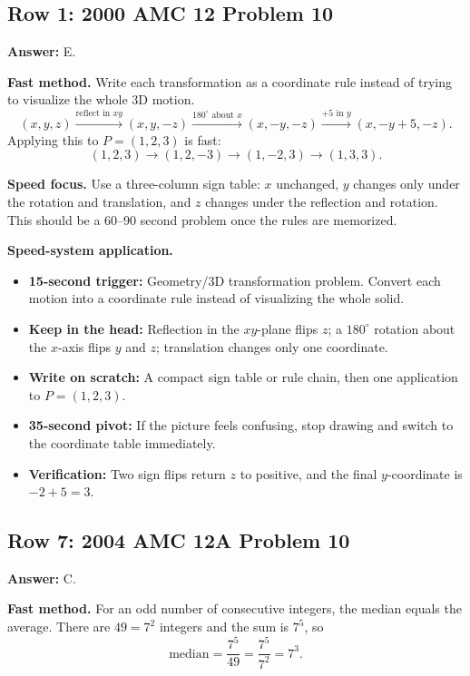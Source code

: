 \documentclass[11pt]{article}
\begin{document}
\subsection{Row 1: 2000 AMC 12 Problem 10}

\textbf{Answer:} E.

\textbf{Fast method.} Write each transformation as a coordinate rule instead of trying to visualize the whole 3D motion.
\[
(x,y,z)\xrightarrow{\text{reflect in }xy}(x,y,-z)
\xrightarrow{180^\circ\text{ about }x}(x,-y,-z)
\xrightarrow{+5\text{ in }y}(x,-y+5,-z).
\]
Applying this to \(P=(1,2,3)\) is fast:
\[
(1,2,3)\to(1,2,-3)\to(1,-2,3)\to(1,3,3).
\]

\textbf{Speed focus.} Use a three-column sign table: \(x\) unchanged, \(y\) changes only under the rotation and translation, and \(z\) changes under the reflection and rotation. This should be a 60--90 second problem once the rules are memorized.

\textbf{Speed-system application.}
\begin{itemize}
  \item \textbf{15-second trigger:} Geometry/3D transformation problem. Convert each motion into a coordinate rule instead of visualizing the whole solid.
  \item \textbf{Keep in the head:} Reflection in the \(xy\)-plane flips \(z\); a \(180^\circ\) rotation about the \(x\)-axis flips \(y\) and \(z\); translation changes only one coordinate.
  \item \textbf{Write on scratch:} A compact sign table or rule chain, then one application to \(P=(1,2,3)\).
  \item \textbf{35-second pivot:} If the picture feels confusing, stop drawing and switch to the coordinate table immediately.
  \item \textbf{Verification:} Two sign flips return \(z\) to positive, and the final \(y\)-coordinate is \(-2+5=3\).
\end{itemize}

\subsection{Row 7: 2004 AMC 12A Problem 10}

\textbf{Answer:} C.

\textbf{Fast method.} For an odd number of consecutive integers, the median equals the average. There are \(49=7^2\) integers and the sum is \(7^5\), so
\[
\text{median}=\frac{7^5}{49}=\frac{7^5}{7^2}=7^3.
\]
\end{document}
